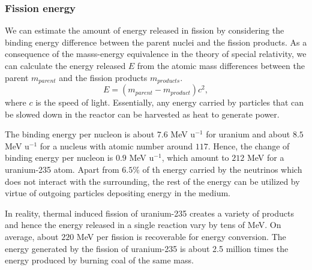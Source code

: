\documentclass[nofootinbib,preprint,aps]{revtex4-1}
\begin{document}
        \subsubsection{Fission energy}
        We can estimate the amount of energy released in fission by considering the binding energy difference
        between the parent nuclei and the fission products. As a consequence of the masss-energy equivalence in the theory
        of special relativity, we can calculate the energy released $E$ from the atomic mass differences between the parent $m_{parent}$
        and the fission products $m_{products}$.
        \begin{equation}
            E = (m_{parent}-m_{product})c^2,
        \end{equation}
        where $c$ is the speed of light.
        Essentially, any energy carried by particles that can be slowed down 
        in the reactor can be harvested as heat to generate power.

        The binding energy per nucleon is about $7.6$ MeV u${}^{-1}$ for uranium and about $8.5$ MeV u${}^{-1}$
        for a nucleus with atomic number around $117$. Hence, the change of binding energy per nucleon is
        $0.9$ MeV u${}^{-1}$, which amount to $212$ MeV for a uranium-235 atom.
        Apart from $6.5\%$ of th energy carried by the neutrinos which does not interact with the surrounding,
        the rest of the energy can be utilized by virtue of outgoing particles depositing energy in the medium.

        In reality, thermal induced fission of uranium-235 creates a variety of products and hence the energy released
        in a single reaction vary by tens of MeV. On average, about $220$ MeV per fission is recoverable for energy conversion.
        The energy generated by the fission of uranium-235 is 
        about 2.5 million times the energy produced by burning coal of the same mass.\cite{e17}
\end{document}
